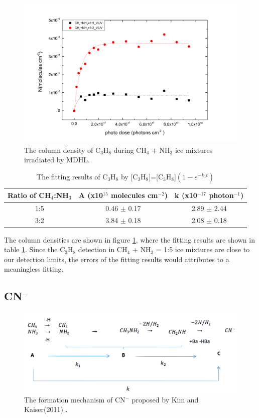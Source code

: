 \begin{figure}
\centering
\includegraphics[width=\textwidth]{figures/chapter3/VUV_C3H8.png}
\caption{The column density of C$_3$H$_8$ during CH$_4$ + NH$_3$ ice mixtures irradiated by MDHL. }
\label{fig:lab_C3H8}
\end{figure}

\begin{table}[htbp]
\caption{The fitting results of C$_3$H$_8$ by [C$_3$H$_8$]=[C$_3$H$_8$]$(1 - e^{-k_1 t})$}
\label{tab:fittingC3H8}
\begin{tabular}{ccc}
\hline
\hline
Ratio of CH$_4$:NH$_3$ & A (x10$^{15}$ molecules cm$^{-2}$) & k (x10$^{-17}$ photon$^{-1}$) \\
\hline
1:5 & 0.46 $\pm$ 0.17 & 2.89 $\pm$ 2.44 \\
3:2 & 3.84 $\pm$ 0.18 & 2.08 $\pm$ 0.18 \\
\hline
\end{tabular}
\end{table}

The column densities are shown in figure \ref{fig:lab_C3H8}, where the fitting results are shown in table \ref{tab:fittingC3H8}. Since the C$_3$H$_8$ detection in CH$_4$ + NH$_3$ = 1:5 ice mixtures are close to our detection limits, the errors of the fitting results would attributes to a meaningless fitting.


\subsection{CN$^-$}

\begin{figure}
\centering
\includegraphics[width=\textwidth]{figures/chapter3/CNmechanism}
\caption{The formation mechanism of CN$^-$ proposed by Kim and Kaiser(2011)\cite{kim} .}
\label{fig:CNmechanism}
\end{figure}

